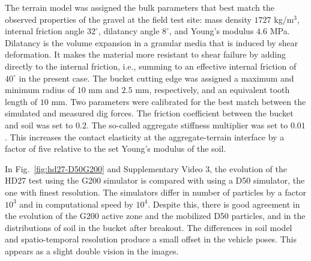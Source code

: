 \documentclass[10pt]{article}
\begin{document}
The terrain model was assigned the bulk parameters that best match the observed
properties of the gravel at the field test site: mass density $1727$ kg/m$^3$, 
internal friction angle $32^\circ$, dilatancy angle $8^\circ$,  
and Young's modulus $4.6$ MPa. Dilatancy is the volume expansion in a granular media that is induced by shear deformation. It makes the material more resistant to shear failure by adding directly to the internal friction, i.e., summing to an effective internal friction of $40^\circ$ in the present case. The bucket cutting edge was assigned a maximum and minimum radius 
of $10$ mm and $2.5$ mm, respectively, and an equivalent tooth length of $10$ mm. Two parameters were
calibrated for the best match between the simulated and measured dig forces. 
The friction coefficient between the bucket and soil was set to $0.2$. The so-called 
aggregate stiffness multiplier was set to $0.01$. This increases the contact elasticity
at the aggregate-terrain interface by a factor of five relative to the set Young's modulus of the soil. 

In Fig.~\ref{fig:hd27-D50G200} and Supplementary Video 3, the evolution of the HD27 test using the G200 
simulator is compared with using a D50 simulator, the one with finest resolution.
The simulators differ in number of particles by a factor $10^3$ and in computational speed by $10^4$. 
Despite this, there is good agreement in the evolution of the G200 active zone and the mobilized D50 particles, and in the distributions of soil in the bucket after breakout.
The differences in soil model and spatio-temporal resolution produce a small offset in the
vehicle poses. This appears as a slight double vision in the images.
\end{document}
